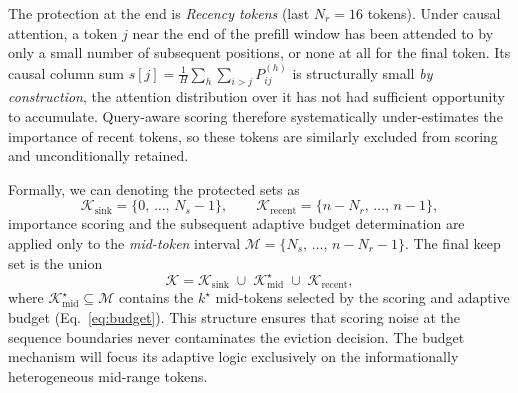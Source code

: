 \documentclass[letterpaper]{article} %
\begin{document}
The protection at the end is \emph{Recency tokens} (last $N_r = 16$ tokens).
Under causal attention, a token $j$ near the end of the prefill window
has been attended to by only a small number of subsequent positions, or none at all for the 
final token.
Its causal column sum
$s[j] = \frac{1}{H}\sum_{h}\sum_{i > j} P_{ij}^{(h)}$
is structurally small \emph{by construction}, the attention distribution over it
has not had sufficient opportunity to accumulate.
Query-aware scoring therefore systematically under-estimates the importance
of recent tokens, so these tokens are similarly excluded from scoring and unconditionally retained.



Formally, we can denoting the protected sets as
\begin{equation}
  \mathcal{K}_{\mathrm{sink}}   = \{0,\,\ldots,\,N_s - 1\},
  \qquad
  \mathcal{K}_{\mathrm{recent}} = \{n - N_r,\,\ldots,\,n - 1\},
  \label{eq:protected}
\end{equation}
importance scoring and the subsequent adaptive budget determination are
applied only to the \emph{mid-token} interval
$\mathcal{M} = \{N_s,\,\ldots,\,n - N_r - 1\}$.
The final keep set is the union
\begin{equation}
  \mathcal{K}
  = \mathcal{K}_{\mathrm{sink}}
    \;\cup\;
    \mathcal{K}_{\mathrm{mid}}^{\star}
    \;\cup\;
    \mathcal{K}_{\mathrm{recent}},
  \label{eq:keepset}
\end{equation}
where $\mathcal{K}_{\mathrm{mid}}^{\star} \subseteq \mathcal{M}$ contains
the $k^{\star}$ mid-tokens selected by the scoring and adaptive budget
(Eq.~\eqref{eq:budget}).
This structure ensures that scoring noise at the sequence boundaries
never contaminates the eviction decision. The budget mechanism will focus
its adaptive logic exclusively on the informationally heterogeneous mid-range
tokens.

\end{document}
